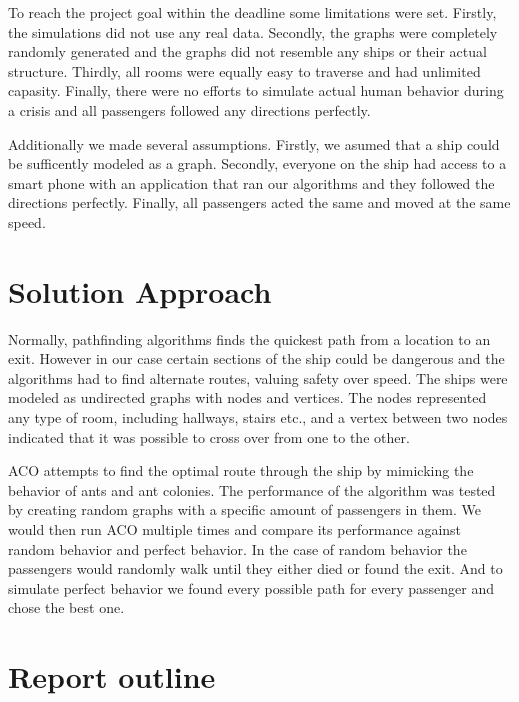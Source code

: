 To reach the project goal within the deadline some limitations were set. Firstly, the simulations did not use 
any real data. Secondly, the graphs were completely randomly generated and the graphs did not resemble
any ships or their actual structure. Thirdly, all rooms were equally easy to traverse and had unlimited capasity. 
Finally, there were no efforts to simulate actual human behavior during a crisis and all passengers followed
any directions perfectly.

Additionally we made several assumptions. Firstly, we asumed that a ship could be sufficently modeled
as a graph. Secondly, everyone on the ship had access to a smart phone with an application that ran our
algorithms and they followed the directions perfectly. Finally, all passengers acted the same and moved at
the same speed.

\section{Solution Approach}

Normally, pathfinding algorithms finds the quickest path from a location to an 
exit. However in our case certain sections of the ship could be dangerous and the algorithms 
had to find alternate routes, valuing safety over speed. The ships were modeled as undirected
graphs with nodes and vertices. The nodes represented any type of room, including
hallways, stairs etc., and a vertex between two nodes indicated that it was possible to
cross over from one to the other.

ACO attempts to find the optimal route through the ship by mimicking the behavior of ants and ant colonies. 
The performance of the algorithm was tested by creating random graphs with a specific amount of
passengers in them. We would then run ACO multiple times and compare its performance against
random behavior and perfect behavior. In the case of random behavior the passengers would randomly
walk until they either died or found the exit. And to simulate perfect behavior we found every possible
path for every passenger and chose the best one.

\section{Report outline}
